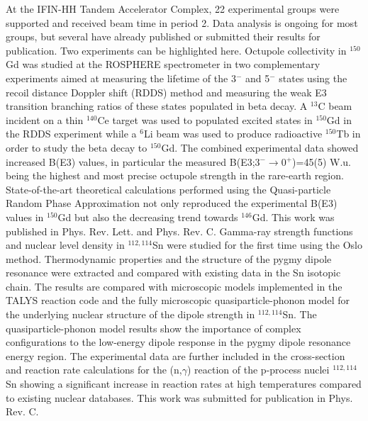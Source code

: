 At the IFIN-HH Tandem Accelerator Complex, 22 experimental groups were supported and received beam time in period 2. Data analysis is ongoing for most groups, but several have already published or submitted their results for publication. Two experiments can be highlighted here. 
Octupole collectivity in $^{150}$Gd was studied at the ROSPHERE spectrometer in two complementary experiments aimed at measuring the lifetime of the 3$^-$ and 5$^-$ states using the recoil distance Doppler shift (RDDS) method and measuring the weak E3 transition branching ratios of these states populated in beta decay. A $^{13}$C beam incident on a thin $^{140}$Ce target was used to populated excited states in $^{150}$Gd in the RDDS experiment while a $^6$Li beam was used to produce radioactive $^{150}$Tb in order to study the beta decay to $^{150}$Gd. The combined experimental data showed increased B(E3) values, in particular the measured B(E3;3$^-$$\rightarrow$0$^+$)=45(5) W.u. being the highest and most precise octupole strength in the rare-earth region. State-of-the-art theoretical calculations performed using the Quasi-particle Random Phase Approximation not only reproduced the experimental B(E3) values in $^{150}$Gd but also the decreasing trend towards $^{146}$Gd. This work 
was published in Phys. Rev. Lett. and Phys. Rev. C.
Gamma-ray strength functions and nuclear level density in $^{112,114}$Sn were studied for the first time using the Oslo method. Thermodynamic properties and the structure of the pygmy dipole resonance were extracted and compared with existing data in the Sn isotopic chain. The results are compared with microscopic models implemented in the TALYS reaction code and the fully microscopic quasiparticle-phonon model for the underlying nuclear structure of the dipole strength in $^{112,114}$Sn. The quasiparticle-phonon model results show the importance of complex configurations to the low-energy dipole response in the pygmy dipole resonance energy region. The experimental data are further included in the cross-section and reaction rate calculations for the (n,$\gamma$) reaction of the p-process nuclei $^{112,114}$Sn showing a significant increase in reaction rates at high temperatures compared to existing nuclear databases. This work was submitted for publication in Phys. Rev. C. 

